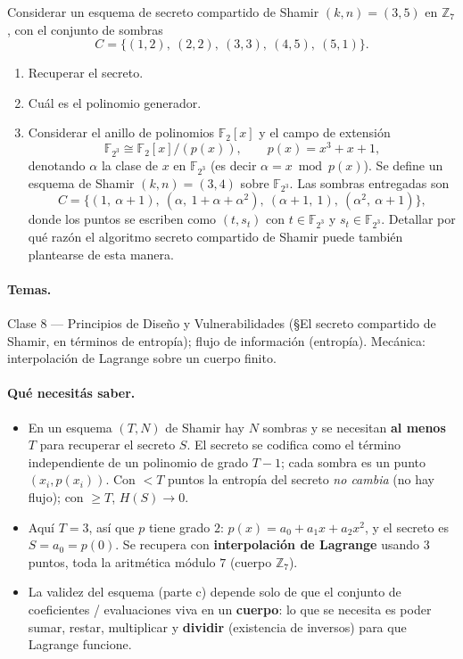 \begin{consigna}
Considerar un esquema de secreto compartido de Shamir $(k,n)=(3,5)$ en $\mathbb{Z}_7$, con el
conjunto de sombras
\begin{equation*}
C = \{(1,2),\ (2,2),\ (3,3),\ (4,5),\ (5,1)\}.
\end{equation*}
\begin{enumerate}
  \item[a)] Recuperar el secreto.
  \item[b)] Cuál es el polinomio generador.
  \item[c)] Considerar el anillo de polinomios $\mathbb{F}_2[x]$ y el campo de extensión
  \begin{equation*}
  \mathbb{F}_{2^3} \cong \mathbb{F}_2[x]/(p(x)),\qquad p(x)=x^3+x+1,
  \end{equation*}
  denotando $\alpha$ la clase de $x$ en $\mathbb{F}_{2^3}$ (es decir $\alpha = x \bmod p(x)$).
  Se define un esquema de Shamir $(k,n)=(3,4)$ sobre $\mathbb{F}_{2^3}$. Las sombras
  entregadas son
  \begin{equation*}
  C=\{(1,\ \alpha+1),\ (\alpha,\ 1+\alpha+\alpha^2),\ (\alpha+1,\ 1),\ (\alpha^2,\ \alpha+1)\},
  \end{equation*}
  donde los puntos se escriben como $(t,s_t)$ con $t\in\mathbb{F}_{2^3}$ y
  $s_t\in\mathbb{F}_{2^3}$. Detallar por qué razón el algoritmo secreto compartido de Shamir
  puede también plantearse de esta manera.
\end{enumerate}
\end{consigna}

\paragraph{Temas.}
Clase 8 --- Principios de Diseño y Vulnerabilidades (\S El secreto compartido de Shamir, en
términos de entropía); flujo de información (entropía). Mecánica: interpolación de Lagrange
sobre un cuerpo finito.

\paragraph{Qué necesitás saber.}
\begin{itemize}
  \item En un esquema $(T,N)$ de Shamir hay $N$ sombras y se necesitan \textbf{al menos $T$}
  para recuperar el secreto $S$. El secreto se codifica como el término independiente de un
  polinomio de grado $T-1$; cada sombra es un punto $(x_i, p(x_i))$. Con $<T$ puntos la
  entropía del secreto \emph{no cambia} (no hay flujo); con $\ge T$, $H(S)\to 0$.
  \item Aquí $T=3$, así que $p$ tiene grado $2$: $p(x)=a_0+a_1x+a_2x^2$, y el secreto es
  $S=a_0=p(0)$. Se recupera con \textbf{interpolación de Lagrange} usando 3 puntos, toda la
  aritmética módulo $7$ (cuerpo $\mathbb{Z}_7$).
  \item La validez del esquema (parte c) depende solo de que el conjunto de coeficientes /
  evaluaciones viva en un \textbf{cuerpo}: lo que se necesita es poder sumar, restar,
  multiplicar y \textbf{dividir} (existencia de inversos) para que Lagrange funcione.
\end{itemize}

